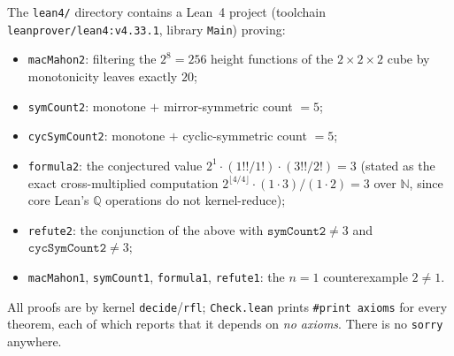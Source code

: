 \documentclass[11pt]{article}
\begin{document}
The \texttt{lean4/} directory contains a Lean~4 project
(toolchain \texttt{leanprover/lean4:v4.33.1}, library \texttt{Main}) proving:
\begin{itemize}
\item \texttt{macMahon2}: filtering the $2^8=256$ height functions of the
  $2\times2\times2$ cube by monotonicity leaves exactly $20$;
\item \texttt{symCount2}: monotone $+$ mirror-symmetric count $= 5$;
\item \texttt{cycSymCount2}: monotone $+$ cyclic-symmetric count $= 5$;
\item \texttt{formula2}: the conjectured value $2^1\cdot(1!!/1!)\cdot(3!!/2!)=3$
  (stated as the exact cross-multiplied computation
  $2^{\lfloor 4/4\rfloor}\cdot(1\cdot3)/(1\cdot2)=3$ over $\mathbb{N}$, since
  core Lean's $\mathbb{Q}$ operations do not kernel-reduce);
\item \texttt{refute2}: the conjunction of the above with
  $\texttt{symCount2}\neq 3$ and $\texttt{cycSymCount2}\neq 3$;
\item \texttt{macMahon1}, \texttt{symCount1}, \texttt{formula1},
  \texttt{refute1}: the $n=1$ counterexample $2\neq 1$.
\end{itemize}
All proofs are by kernel \texttt{decide}/\texttt{rfl}; \texttt{Check.lean}
prints \texttt{\#print axioms} for every theorem, each of which reports that it
depends on \emph{no axioms}.  There is no \texttt{sorry} anywhere.
\end{document}
